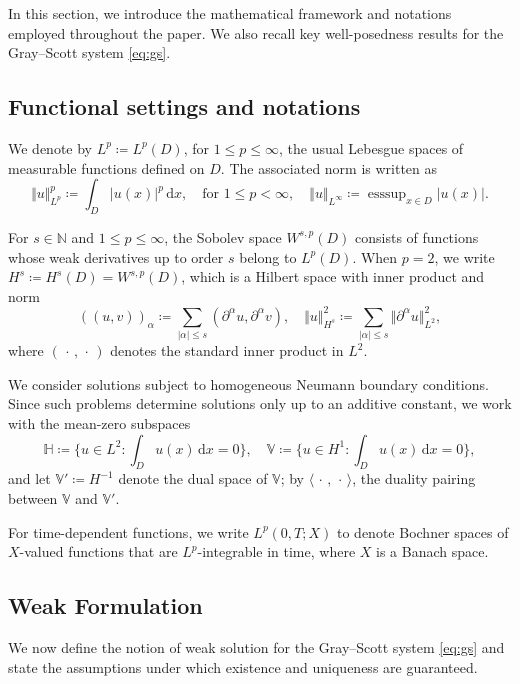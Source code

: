 \documentclass[11pt, a4paper]{amsart}
\newcommand{\la}{\langle}
\newcommand{\ra}{\rangle}
\newcommand{\dd}{\,\mathrm{d}}
\newcommand{\NN}{\mathbb{N}}
\newcommand{\HH}{\mathbb{H}}
\newcommand{\VV}{\mathbb{V}}
\DeclareMathOperator*{\esssup}{{esssup}}
\numberwithin{equation}{section}
\begin{document}
	In this section, we introduce the mathematical framework and notations employed throughout the paper. We also recall key well-posedness results for the Gray--Scott system \eqref{eq:gs}.
	
	\subsection{Functional settings and notations}\label{subsec:settings}

	We denote by $L^p\coloneqq L^p(D)$, for $1 \leq p \leq \infty$, the usual Lebesgue spaces of measurable functions defined on $D$. The associated norm is written as
	\[
	\Vert u \Vert_{L^p}^p \coloneqq   \int_D \vert u(x)\vert^p \dd x  , \quad \text{for } 1 \leq p < \infty, \quad\Vert u \Vert_{L^\infty} \coloneqq \esssup_{x \in D} \vert u(x)\vert .
	\]
	
	For $s\in\NN$ and $1 \leq p \leq \infty$, the Sobolev space $W^{s, p}(D)$ consists of functions whose weak derivatives up to order $s$ belong to  $L^p(D)$. When $p = 2$, we write $H^s\coloneqq H^s(D)= W^{s,p}(D)$, which is a Hilbert space with inner product and norm
	\[
	((u,v))_\alpha\coloneqq \sum_{\vert\alpha\vert\leq s} (\partial^\alpha u,\partial^\alpha v),\quad\Vert u\Vert_{H^s}^2\coloneqq \sum_{\vert\alpha\vert\leq s} \Vert \partial^\alpha u\Vert ^2_{L^2} ,
	\]
	where $(\,\cdot\,,\,\cdot\,)$ denotes the standard inner product in $L^2$. 
	
	We consider solutions subject to homogeneous Neumann boundary conditions. Since such problems determine solutions only up to an additive constant, we work with the mean-zero subspaces
	$$
	\HH\coloneqq\bigg\{u\in L^2:\int_D u(x)\dd x  = 0\bigg\},\quad \VV\coloneqq\bigg\{u\in H^1:\int_D u(x)\dd x  = 0\bigg\},
	$$
	and let $\VV'\coloneqq H^{-1}$ denote  the dual space of $\VV$;   by $\la\,\cdot\,,\,\cdot\,\ra$, the duality pairing between $\VV$ and $\VV'$.
	
	For time-dependent functions, we write $L^p(0,T;X)$ to denote Bochner spaces of $X$-valued functions that are $L^p$-integrable in time, where $X$ is a Banach space.
	
	
	\subsection{Weak Formulation}\label{subsec:weak_formulation}
	We now define the notion of weak solution for the Gray--Scott system \eqref{eq:gs} and state the assumptions under which existence and uniqueness are guaranteed.
	
\end{document}
